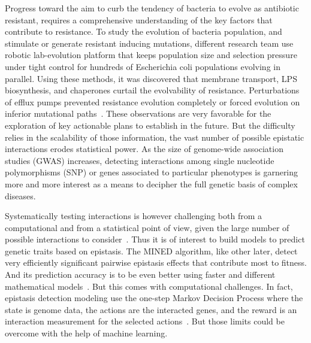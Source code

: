 \documentclass[12pt]{article}
\begin{document}
  Progress toward the aim to curb the tendency of bacteria to evolve as
  antibiotic resistant, requires a comprehensive understanding of the key
  factors that contribute to resistance. To study the evolution of bacteria
  population, and stimulate or generate resistant inducing mutations, different
  research team use robotic lab-evolution platform that keeps population size
  and selection pressure under tight control for hundreds of Escherichia coli
  populations evolving in parallel. Using these methods, it was discovered that
  membrane transport, LPS biosynthesis, and chaperones curtail the evolvability
  of resistance. Perturbations of efflux pumps prevented resistance evolution
  completely or forced evolution on inferior mutational
  paths~\cite{lukacisinova2019exploiting}. These observations are very
  favorable for the exploration of key actionable plans to establish in the
  future. But the difficulty relies in the scalability of those information,
  the vast number of possible epistatic interactions erodes statistical power.
  As the size of genome-wide association studies (GWAS) increases, detecting
  interactions among single nucleotide polymorphisms (SNP) or genes associated
  to particular phenotypes is garnering more and more interest as a means to
  decipher the full genetic basis of complex diseases. 

  Systematically testing interactions is however challenging both from a
  computational and from a statistical point of view, given the large number of
  possible interactions to consider~\cite{slim2019novel}. Thus it is of
  interest to build models to predict genetic traits based on epistasis. The
  MINED algorithm, like other later, detect very efficiently significant
  pairwise epistasis effects that contribute most to fitness. And its
  prediction accuracy is to be even better using faster and different
  mathematical models~\cite{he2015mined}. But this comes with computational
  challenges. In fact, epistasis detection modeling use the one-step Markov
  Decision Process where the state is genome data, the actions are the
  interacted genes, and the reward is an interaction measurement for the
  selected actions~\cite{huang2019epirl}. But those limits could be overcome
  with the help of machine learning.
\end{document}
